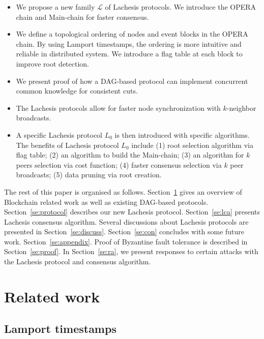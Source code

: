 \documentclass[preprint,12pt]{elsarticle}
\begin{document}
\begin{itemize}
	\item We propose a new family $\mathcal{L}$ of Lachesis protocols. We introduce the OPERA chain and Main-chain for faster consensus.
	\item We define a topological ordering of nodes and event blocks in the OPERA chain. By using Lamport timestamps, the ordering is more intuitive and reliable in distributed system. We introduce a flag table at each block to improve root detection.
	\item We present proof of how a DAG-based protocol can implement concurrent common knowledge for consistent cuts.
	\item The Lachesis protocols allow for faster node synchronization with $k$-neighbor broadcasts.
	
	\item A specific Lachesis protocol $L_0$ is then introduced with specific algorithms. The benefits of Lachesis protocol $L_0$ include (1) root selection algorithm via flag table;  (2) an algorithm to build the Main-chain; (3) an algorithm for $k$ peers selection via cost function; (4) faster consensus selection via $k$ peer broadcasts; (5) data pruning via root creation. 
	
\end{itemize}



The rest of this paper is organised as follows. Section~\ref{se:Previous} gives an overview of Blockchain related work as well as existing DAG-based protocols.        
Section~\ref{se:protocol} describes our new Lachesis protocol. Section~\ref{se:lca} presents Lachesis consensus algorithm.
Several discussions about Lachesis protocols are presented in Section~\ref{se:discuss}. Section~\ref{se:con} concludes with some future work. Section~\ref{se:appendix}. Proof of Byzantine fault tolerance is described in Section~\ref{se:proof}. In Section~\ref{se:ra}, we present  responses to certain attacks with the Lachesis protocol and consensus algorithm.


\section{Related work}\label{se:Previous}

\subsection{Lamport timestamps}
\end{document}

